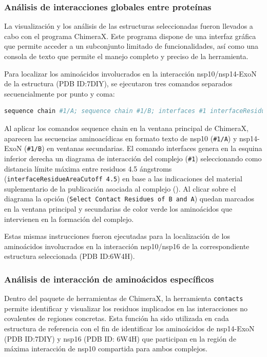 \subsubsection{Análisis de interacciones globales entre proteínas}

La visualización y los análisis de las estructuras seleccionadas fueron 
llevados a cabo con el programa ChimeraX. Este programa dispone de una 
interfaz gráfica que permite acceder a un subconjunto limitado de 
funcionalidades, así como una consola de texto que permite el manejo 
completo y preciso de la herramienta.

Para localizar los aminoácidos involucrados en la interacción 
nsp10/nsp14-ExoN de la estructura (PDB ID:7DIY), se ejecutaron tres
comandos separados secuencialmente por punto y coma:

\begin{lstlisting}[language=bash]
 sequence chain #1/A; sequence chain #1/B; interfaces #1 interfaceResidueAreaCutoff 4.5
\end{lstlisting}

Al aplicar los comandos sequence chain en la ventana principal de ChimeraX,
aparecen las secuencias aminoacídicas en formato texto de nsp10 
(\lstinline!#1/A!) y nsp14-ExoN (\lstinline!#1/B!) en ventanas secundarias. 
El comando interfaces genera en la esquina inferior derecha un diagrama de 
interacción del complejo (\lstinline!#1!) seleccionando como distancia 
límite máxima entre residuos 4.5 ángstroms 
(\lstinline!interfaceResidueAreaCutoff 4.5!) en base a las indicaciones del 
material suplementario de la publicación asociada al complejo 
(\cite{lin_crystal_2021}). Al clicar sobre el diagrama la opción 
(\lstinline!Select Contact Residues of B and A!) quedan marcados en la 
ventana principal y secundarias de color verde los aminoácidos que 
intervienen en la formación del complejo.

Estas mismas instrucciones fueron ejecutadas para la localización de los 
aminoácidos involucrados en la interacción nsp10/nsp16 de la correspondiente
estructura seleccionada (PDB ID:\@ 6W4H).

\subsubsection{Análisis de interacción de aminoácidos específicos}

Dentro del paquete de herramientas de ChimeraX, la herramienta 
\lstinline!contacts! permite identificar y visualizar los residuos 
implicados en las interacciones no covalentes de regiones concretas. Esta 
función ha sido utilizada en cada estructura de referencia con el fin de 
identificar los aminoácidos de nsp14-ExoN (PDB ID:\@ 7DIY) y nsp16 (PDB ID:\@ 
6W4H) que participan en la región de máxima interacción de nsp10 compartida 
para ambos complejos.

